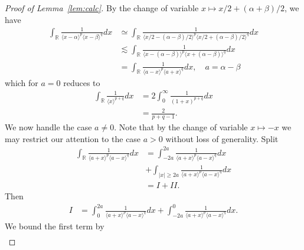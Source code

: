 \documentclass[12pt,reqno]{amsart}
\numberwithin{equation}{section}  %
\numberwithin{figure}{section}
\newcommand{\rr}{\mathbb{R}}
\begin{document}
%
%
%
\begin{proof}[Proof of Lemma~\ref{lem:calc}]
%
By the change of variable $x \mapsto x/2 + (\alpha + \beta)/2$, we have
%
%
\begin{equation}
\label{rur}
\begin{split}
\int_{\rr} \frac{1}{\langle x - \alpha \rangle^{p} \langle  x -
\beta
\rangle^{q}}d x
& \simeq \int_{\rr} \frac{1}{\langle x/2 - (\alpha - \beta)/2  \rangle^{p}
\langle  x/2 + (\alpha - \beta)/2 \rangle^{q}} d x
\\
& \lesssim \int_{\rr} \frac{1}{\langle x - (\alpha - \beta)  \rangle^{p}
\langle  x + (\alpha - \beta) \rangle^{q}} d x
\\
& = \int_{\rr} \frac{1}{\langle a - x \rangle ^{p} \langle a + x \rangle
^{q}} d x, \quad a = \alpha - \beta
\end{split}
\end{equation}
%
which for $a =0$ reduces to 
%
%
\begin{equation*}
\begin{split}
\int_{\rr} \frac{1}{\langle x \rangle ^{p+q}} d x 
& = 2 \int_{0}^{\infty} \frac{1}{(1 + x)^{p+q}} d x
\\
& = \frac{2}{p+q -1}.
\end{split}
\end{equation*}
%
%
We now handle the case $a \neq 0$. Note that by the change of variable $x \mapsto
-x$ we may restrict our attention to the case  $a > 0$ without loss of
generality. Split
%
%
\begin{equation*}
\begin{split}
\int_{\rr} \frac{1}{\langle a + x \rangle ^{p} \langle a - x \rangle
^{q}} d x
& = \int_{-2a}^{2a}
\frac{1}{\langle a + x \rangle ^{p} \langle a - x \rangle
^{q}} d x
\\
& + \int_{| x | \ge 2a} 
\frac{1}{\langle a + x \rangle ^{p} \langle a - x \rangle
^{q}} d x
\\
& = I + II.
\end{split}
\end{equation*}
%
%
Then
\begin{equation*}
\begin{split}
I 
& = \int_{0}^{2a}
\frac{1}{\langle a + x \rangle ^{p} \langle a - x \rangle
^{q}} d x + \int_{-2a}^{0}
\frac{1}{\langle a + x \rangle ^{p} \langle a - x \rangle
^{q}} d x.
\end{split}
\end{equation*}
We bound the first term by
\begin{equation*}
\begin{split}

\end{split}
\end{equation*}
\end{proof}
\end{document}
